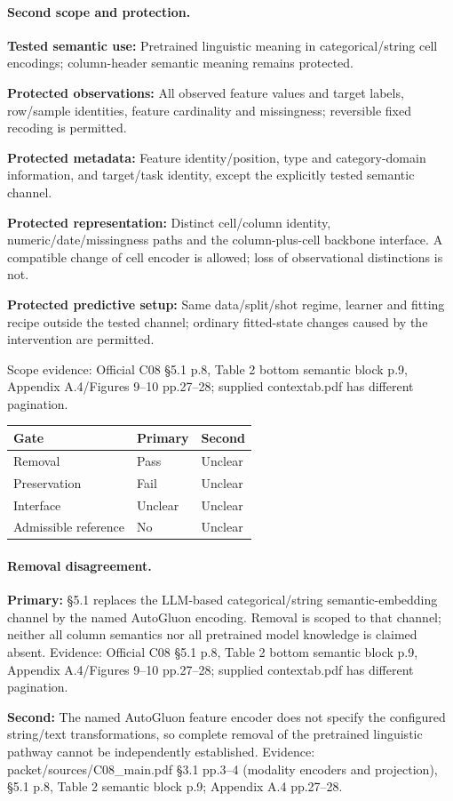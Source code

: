 \documentclass[10pt]{article}
\begin{document}
\paragraph{Second scope and protection.}
\textbf{Tested semantic use:} Pretrained linguistic meaning in categorical/string cell encodings; column-header semantic meaning remains protected.\par
\textbf{Protected observations:} All observed feature values and target labels, row/sample identities, feature cardinality and missingness; reversible fixed recoding is permitted.\par
\textbf{Protected metadata:} Feature identity/position, type and category-domain information, and target/task identity, except the explicitly tested semantic channel.\par
\textbf{Protected representation:} Distinct cell/column identity, numeric/date/missingness paths and the column-plus-cell backbone interface. A compatible change of cell encoder is allowed; loss of observational distinctions is not.\par
\textbf{Protected predictive setup:} Same data/split/shot regime, learner and fitting recipe outside the tested channel; ordinary fitted-state changes caused by the intervention are permitted.\par
Scope evidence: Official C08 §5.1 p.8, Table 2 bottom semantic block p.9, Appendix A.4/Figures 9--10 pp.27--28; supplied contextab.pdf has different pagination.\par
\begin{tabular}{lll}\toprule Gate & Primary & Second \\ \midrule
Removal & Pass & Unclear \\
Preservation & Fail & Unclear \\
Interface & Unclear & Unclear \\
Admissible reference & No & Unclear \\
\bottomrule\end{tabular}
\paragraph{Removal disagreement.}
\textbf{Primary:} §5.1 replaces the LLM-based categorical/string semantic-embedding channel by the named AutoGluon encoding. Removal is scoped to that channel; neither all column semantics nor all pretrained model knowledge is claimed absent. Evidence: Official C08 §5.1 p.8, Table 2 bottom semantic block p.9, Appendix A.4/Figures 9--10 pp.27--28; supplied contextab.pdf has different pagination.\par
\textbf{Second:} The named AutoGluon feature encoder does not specify the configured string/text transformations, so complete removal of the pretrained linguistic pathway cannot be independently established. Evidence: packet/sources/C08\_main.pdf §3.1 pp.3--4 (modality encoders and projection), §5.1 p.8, Table 2 semantic block p.9; Appendix A.4 pp.27--28.\par
\end{document}
